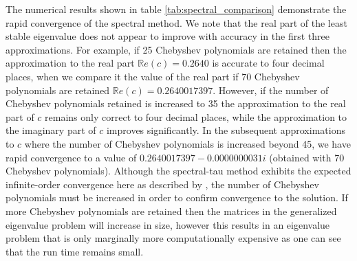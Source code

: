 \documentclass[a4paper, 12pt, twoside, openright]{article}
\numberwithin{equation}{section}
\begin{document}
% 
% 
The numerical results shown in table \ref{tab:spectral_comparison} demonstrate the rapid convergence of the spectral method. We note that the real part of the least stable eigenvalue does not appear to improve with accuracy in the first three approximations. For example, if 25 Chebyshev polynomials are retained then the approximation to the real part $\mathbb{R}e(c)=0.2640$ is accurate to four decimal places, when we compare it the value of the real part if 70 Chebyshev polynomials are retained $\mathbb{R}e(c)=0.2640017397$. However, if the number of Chebyshev polynomials retained is increased to 35 the approximation to the real part of $c$ remains only correct to four decimal places, while the approximation to the imaginary part of $c$ improves significantly. In the subsequent approximations to $c$ where the number of Chebyshev polynomials is increased beyond 45, we have rapid convergence to a value of $0.2640017397 - 0.0000000031i$ (obtained with 70 Chebyshev polynomials). Although the spectral-tau method exhibits the expected infinite-order convergence here as described by \cite{Orszag71}, the number of Chebyshev polynomials must be increased in order to confirm convergence to the solution. If more Chebyshev polynomials are retained then the matrices in the generalized eigenvalue problem will increase in size, however this results in an eigenvalue problem that is only marginally more computationally expensive as one can see that the run time remains small. %
\end{document}
